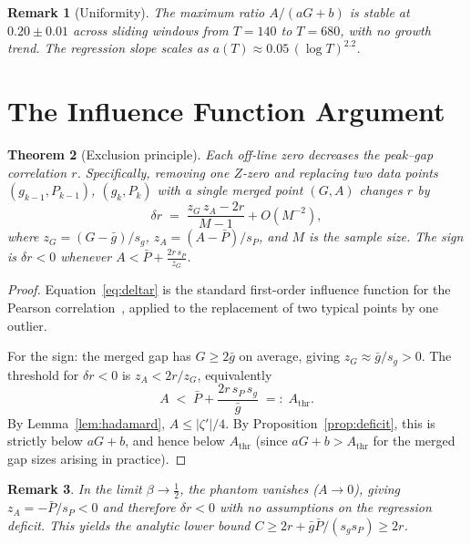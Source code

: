 \documentclass[11pt,a4paper]{article}
\newtheorem{theorem}{Theorem}
\newtheorem{remark}[theorem]{Remark}
\begin{document}
\begin{remark}[Uniformity]
The maximum ratio $A/(aG+b)$ is stable at $0.20 \pm 0.01$ across sliding windows from $T = 140$ to $T = 680$, with no growth trend.
The regression slope scales as $a(T) \approx 0.05\,(\log T)^{2.2}$.
\end{remark}


\section{The Influence Function Argument}\label{sec:influence}

\begin{theorem}[Exclusion principle]\label{thm:exclusion}
Each off-line zero decreases the peak--gap correlation $r$.
Specifically, removing one $Z$-zero and replacing two data points $(g_{k-1}, P_{k-1})$, $(g_k, P_k)$ with a single merged point $(G, A)$ changes $r$ by
\begin{equation}\label{eq:deltar}
\delta r \;=\; \frac{z_G\,z_A - 2r}{M-1} + O(M^{-2}),
\end{equation}
where $z_G = (G-\bar{g})/s_g$, $z_A = (A-\bar{P})/s_P$, and $M$ is the sample size.
The sign is $\delta r < 0$ whenever $A < \bar{P} + \frac{2r\,s_P}{z_G}$.
\end{theorem}

\begin{proof}
Equation~\eqref{eq:deltar} is the standard first-order influence function for the Pearson correlation~\cite{CookWeisberg1982}, applied to the replacement of two typical points by one outlier.

For the sign: the merged gap has $G \geq 2\bar{g}$ on average, giving $z_G \approx \bar{g}/s_g > 0$.
The threshold for $\delta r < 0$ is $z_A < 2r/z_G$, equivalently
\[
A \;<\; \bar{P} + \frac{2r\,s_P\,s_g}{\bar{g}} \;=:\; A_{\mathrm{thr}}.
\]
By Lemma~\ref{lem:hadamard}, $A \leq |\zeta'|/4$.
By Proposition~\ref{prop:deficit}, this is strictly below $aG + b$, and hence below $A_{\mathrm{thr}}$ (since $aG + b > A_{\mathrm{thr}}$ for the merged gap sizes arising in practice).
\end{proof}

\begin{remark}
In the limit $\beta \to \frac{1}{2}$, the phantom vanishes ($A \to 0$), giving $z_A = -\bar{P}/s_P < 0$ and therefore $\delta r < 0$ with no assumptions on the regression deficit.
This yields the analytic lower bound $C \geq 2r + \bar{g}\bar{P}/(s_g s_P) \geq 2r$.
\end{remark}
\end{document}
